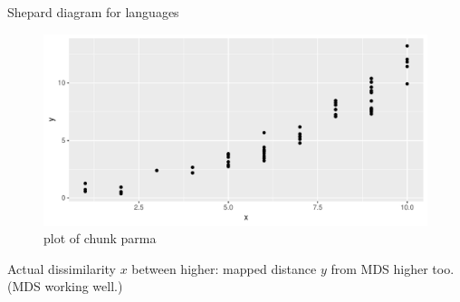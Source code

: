 \documentclass[ignorenonframetext,]{beamer}
\newenvironment{Shaded}{\begin{snugshade}}{\end{snugshade}}
\newcommand{\DataTypeTok}[1]{\textcolor[rgb]{0.13,0.29,0.53}{#1}}
\newcommand{\KeywordTok}[1]{\textcolor[rgb]{0.13,0.29,0.53}{\textbf{#1}}}
\newcommand{\NormalTok}[1]{#1}
\newcommand{\OperatorTok}[1]{\textcolor[rgb]{0.81,0.36,0.00}{\textbf{#1}}}
\newcommand{\StringTok}[1]{\textcolor[rgb]{0.31,0.60,0.02}{#1}}
\begin{document}
\begin{frame}[fragile]{Shepard diagram for languages}
\protect\hypertarget{shepard-diagram-for-languages}{}

\begin{Shaded}
\end{Shaded}

\begin{figure}
\centering
\includegraphics{figure/parma-1.pdf}
\caption{plot of chunk parma}
\end{figure}

Actual dissimilarity \(x\) between higher: mapped distance \(y\) from
MDS higher too. (MDS working well.)

\end{frame}
\end{document}
